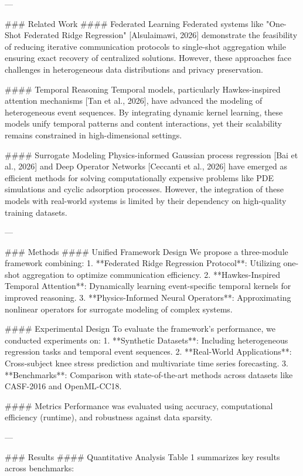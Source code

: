 ---

### Related Work  
#### Federated Learning  
Federated systems like "One-Shot Federated Ridge Regression" [Alsulaimawi, 2026] demonstrate the feasibility of reducing iterative communication protocols to single-shot aggregation while ensuring exact recovery of centralized solutions. However, these approaches face challenges in heterogeneous data distributions and privacy preservation.

#### Temporal Reasoning  
Temporal models, particularly Hawkes-inspired attention mechanisms [Tan et al., 2026], have advanced the modeling of heterogeneous event sequences. By integrating dynamic kernel learning, these models unify temporal patterns and content interactions, yet their scalability remains constrained in high-dimensional settings.

#### Surrogate Modeling  
Physics-informed Gaussian process regression [Bai et al., 2026] and Deep Operator Networks [Ceccanti et al., 2026] have emerged as efficient methods for solving computationally expensive problems like PDE simulations and cyclic adsorption processes. However, the integration of these models with real-world systems is limited by their dependency on high-quality training datasets.

---

### Methods  
#### Unified Framework Design  
We propose a three-module framework combining:  
1. **Federated Ridge Regression Protocol**: Utilizing one-shot aggregation to optimize communication efficiency.  
2. **Hawkes-Inspired Temporal Attention**: Dynamically learning event-specific temporal kernels for improved reasoning.  
3. **Physics-Informed Neural Operators**: Approximating nonlinear operators for surrogate modeling of complex systems.

#### Experimental Design  
To evaluate the framework's performance, we conducted experiments on:  
1. **Synthetic Datasets**: Including heterogeneous regression tasks and temporal event sequences.  
2. **Real-World Applications**: Cross-subject knee stress prediction and multivariate time series forecasting.  
3. **Benchmarks**: Comparison with state-of-the-art methods across datasets like CASF-2016 and OpenML-CC18.

#### Metrics  
Performance was evaluated using accuracy, computational efficiency (runtime), and robustness against data sparsity.

---

### Results  
#### Quantitative Analysis  
Table 1 summarizes key results across benchmarks:  


